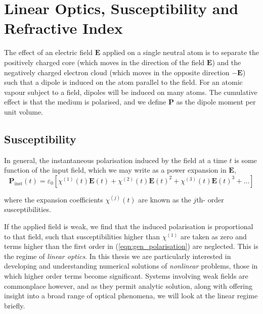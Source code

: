 \section{Linear Optics, Susceptibility and Refractive Index}
  \label{sec:propagation_susc}


  The effect of an electric field $\mathbf{E}$ applied on a single neutral atom
  is to separate the positively charged core (which moves in the direction of
  the field $\mathbf{E}$) and the negatively charged electron cloud (which moves
  in the opposite direction $-\mathbf{E}$) such that a dipole is induced on the
  atom parallel to the field. For an atomic vapour subject to a field, dipoles
  will be induced on many atoms. The cumulative effect is that the medium is
  polarised, and we define $\mathbf{P}$ as the dipole moment per unit volume.

  \subsection{Susceptibility}

    In general, the instantaneous polarisation induced by the field at a time
    $t$ is some function of the input field, which we may write as a power
    expansion\cite{boyd2008nonlinear} in $\mathbf{E}$,
    \begin{equation}\label{eqn:gen_polarisation}
      \mathbf{P}_{\mathrm{inst}}(t) = \varepsilon_0 \left
          [ \chi^{(1)}(t) \mathbf{E}(t) +  
      \chi^{(2)}(t) \mathbf{E}(t)^2 + 
      \chi^{(3)}(t) \mathbf{E}(t)^3 + \dots \right]
    \end{equation}

    where the expansion coefficients $\chi^{(j)}(t)$ are known as the $j$th-
    order susceptibilities.

    If the applied field is weak, we find that the induced polarisation is
    proportional to that field, such that susceptibilities higher than
    $\chi^{(1)}$ are taken as zero and terms higher than the first order in
    (\ref{eqn:gen_polarisation}) are neglected. This is the regime of
    \textit{linear optics}. In this thesis we are particularly interested in
    developing and understanding numerical solutions of \textit{nonlinear}
    problems, \ie those in which higher order terms become significant. Systems
    involving weak fields are commonplace however, and as they permit analytic
    solution, along with offering insight into a broad range of optical
    phenomena, we will look at the linear regime briefly.

